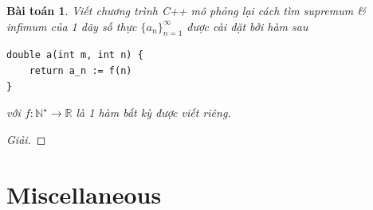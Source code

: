 \documentclass{article}
\newtheorem{baitoan}{Bài toán}
\begin{document}
\begin{baitoan}
	Viết chương trình C++ mô phỏng lại cách tìm supremum \& infimum của 1 dãy số thực $\{a_n\}_{n=1}^\infty$ được cài đặt bởi hàm sau
	\begin{verbatim}
double a(int m, int n) {
    return a_n := f(n)
}
	\end{verbatim}
	với $f:\mathbb{N}^\star\to\mathbb{R}$ là 1 hàm bất kỳ được viết riêng.
\end{baitoan}

\begin{proof}[Giải]
	
\end{proof}


\section{Miscellaneous}


\printbibliography[heading=bibintoc]
	
\end{document}

